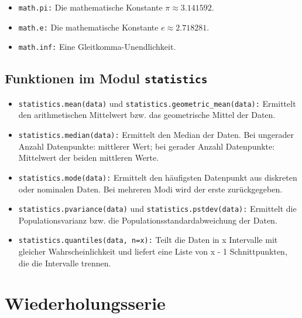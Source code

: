 \documentclass[11pt, oneside]{book}
\begin{document}
\begin{itemize}
    \item \texttt{math.pi:} Die mathematische Konstante $\pi \approx 3.141592$.
    
    \item \texttt{math.e:} Die mathematische Konstante $e \approx 2.718281$.
    
    \item \texttt{math.inf:} Eine Gleitkomma-Unendlichkeit.
\end{itemize}

\section{Funktionen im Modul \texttt{statistics}}

\begin{itemize}
    \item \texttt{statistics.mean(data)} und \texttt{statistics.geometric\_mean(data):} Ermittelt den arithmetischen Mittelwert bzw. das geometrische Mittel der Daten.
    
    \item \texttt{statistics.median(data):} Ermittelt den Median der Daten. Bei ungerader Anzahl Datenpunkte: mittlerer Wert; bei gerader Anzahl Datenpunkte: Mittelwert der beiden mittleren Werte.
    
    \item \texttt{statistics.mode(data):} Ermittelt den häufigsten Datenpunkt aus diskreten oder nominalen Daten. Bei mehreren Modi wird der erste zurückgegeben.
    
    \item \texttt{statistics.pvariance(data)} und \texttt{statistics.pstdev(data):} Ermittelt die Populationsvarianz bzw. die Populationsstandardabweichung der Daten.
    
    \item \texttt{statistics.quantiles(data, n=x):} Teilt die Daten in x Intervalle mit gleicher Wahrscheinlichkeit und liefert eine Liste von x - 1 Schnittpunkten, die die Intervalle trennen.
\end{itemize}


\chapter{Wiederholungsserie}
\end{document}
